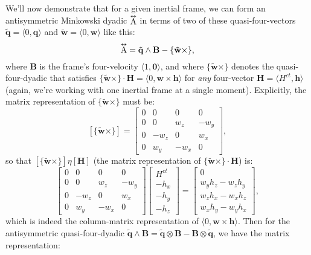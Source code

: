 \documentclass[12pt]{article}
\renewcommand{\vv}[1]{\mathbf{#1}}
\newcommand{\tightoverset}[2]{%
  \mathop{#2}\limits^{\vbox to -.5ex{\kern-0.75ex\hbox{$#1$}\vss}}}
\newcommand{\inlinedy}[1]{\tightoverset{\text{\tiny$\bm\leftrightarrow$}}{#1}}
\newcommand{\capdy}[1]{ \overset{ \text{\tiny$\bm\leftrightarrow$} }{\vphantom{\text{\small{A}}}\smash{#1}} }
\begin{document}
We'll now demonstrate that for a given inertial frame, we can form an antisymmetric Minkowski dyadic $\inlinedy{\mathrm{A}}$ in terms of two of these quasi-four-vectors $\tilde{\vv q} = \langle 0, \vv q \rangle$ and $\tilde{\vv w} = \langle 0, \vv w \rangle$ like this:
\begin{equation*}
\capdy{\mathrm{A}} = \tilde{\vv q} \wedge \vv B - \{ \tilde{\vv w} \times \},
\end{equation*}
where $\vv B$ is the frame's four-velocity $\langle 1, \vv 0 \rangle$, and where $\{ \tilde{\vv w} \times \}$ denotes the quasi-four-dyadic that satisfies $\{ \tilde{\vv w} \times \} \cdot \vv H = \langle 0, \vv w \times \vv h \rangle$ for \emph{any} four-vector ${\vv H = \langle H^{ct}, \vv h \rangle}$ (again, we're working with one inertial frame at a single moment). Explicitly, the matrix representation of $\{ \tilde{\vv w} \times \}$ must be:
\begin{equation}\label{eq:wt}
[\{ \tilde{\vv w} \times \}] =
\begin{bmatrix}
0 & 0 & 0 & 0 \\
0 & 0 & w_z & -w_y \\
0 & -w_z & 0 & w_x \\
0 & w_y & -w_x & 0
\end{bmatrix},
\end{equation}
so that $[\{ \tilde{\vv w} \times \}] \eta [\vv H]$ (the matrix representation of $\{ \tilde{\vv w} \times \} \cdot \vv H$) is:
\begin{equation*}
\begin{bmatrix}
0 & 0 & 0 & 0 \\
0 & 0 & w_z & -w_y \\
0 & -w_z & 0 & w_x \\
0 & w_y & -w_x & 0
\end{bmatrix}
\begin{bmatrix}
H^{ct} \\
- h_x \\
- h_y \\
- h_z
\end{bmatrix}
=
\begin{bmatrix}
0 \\
w_y h_z - w_z h_y \\
w_z h_x - w_x h_z \\
w_x h_y - w_y h_x
\end{bmatrix},
\end{equation*}
which is indeed the column-matrix representation of $\langle 0, \vv w \times \vv h \rangle$. Then for the antisymmetric quasi-four-dyadic $\tilde{\vv q} \wedge \vv B = \tilde{\vv q} \otimes \vv B - \vv B \otimes \tilde{\vv q}$, we have the matrix representation:
\end{document}
